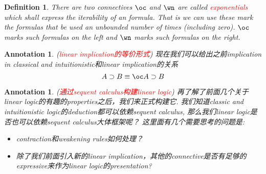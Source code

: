 \documentclass{article}
\theoremstyle{plain}
\newtheorem{definition}[theorem]{Definition}
\newtheorem{annotation}[theorem]{Annotation}
\theoremstyle{nonumberplain}
\newcommand{\redt}[1]{\textcolor{red}{#1}}
\begin{document}
\begin{definition}
\rm There are two connectives $\oc$ and $\wn$ are called \redt{exponentials} which shall express the iterability of an formula.  That is we can use these mark the formulas that be used an unbounded number of times (including zero). $\oc$ marks such formulas on the left and $\wn$ marks such formulas on the right. 
\end{definition}

\begin{annotation}
\rm (\redt{linear implication的等价形式}) 现在我们可以给出之前implication in classical and intuitionistic和linear implication的关系
\[
A \supset B \equiv \oc A \supset B
\] 
\end{annotation}

\begin{annotation}
\rm (\redt{通过sequent calculus构建linear logic}) 再了解了前面几个关于linear logic的有趣的properties之后，我们来正式构建它. 我们知道classic and intuitionistic logic的deduction都可以依赖sequent calculus, 那么我们linear logic是否也可以依赖sequent calculus大体框架呢？ 这里面有几个需要思考的问题是:
\begin{itemize}
	\item contraction和weakening rules如何处理？
	\item 除了我们前面引入新的linear implication，其他的connective是否有足够的expressive来作为linear logic的presentation?
\end{itemize} 


\end{annotation}
\end{document}
